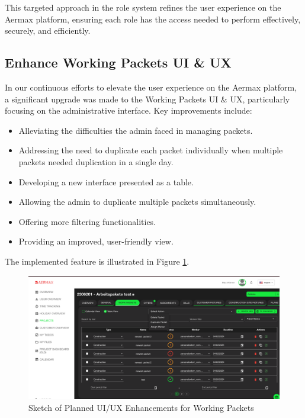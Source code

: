 This targeted approach in the role system refines the user experience on the Aermax platform, ensuring each role has the access needed to perform effectively, securely, and efficiently.

\subsection{Enhance Working Packets UI \& UX}
In our continuous efforts to elevate the user experience on the Aermax platform, a significant upgrade was made to the Working Packets UI \& UX, particularly focusing on the administrative interface. Key improvements include:

\begin{itemize}
    \item Alleviating the difficulties the admin faced in managing packets.
    \item Addressing the need to duplicate each packet individually when multiple packets needed duplication in a single day.
    \item Developing a new interface presented as a table.
    \item Allowing the admin to duplicate multiple packets simultaneously.
    \item Offering more filtering functionalities.
    \item Providing an improved, user-friendly view.
\end{itemize}

The implemented feature is illustrated in Figure \ref{fig:ui_ux_enhancements}.

\begin{figure}[H]
    \centering
    \includegraphics[width=1\textwidth]{src/assets/chapters/newTable2.png}
    \caption{Sketch of Planned UI/UX Enhancements for Working Packets}
    \label{fig:ui_ux_enhancements}
\end{figure}

